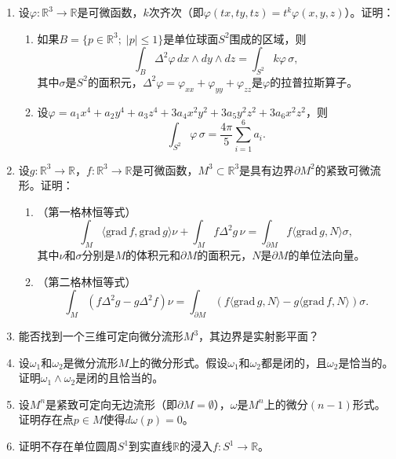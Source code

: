 \documentclass[12pt,a4paper]{ctexbook}
\begin{document}
\begin{enumerate}
    \item 设$\varphi:\mathbb{R}^3\to\mathbb{R}$是可微函数，$k$次齐次（即$\varphi(tx,ty,tz) = t^k\varphi(x,y,z)$）。证明：
    \begin{enumerate}[label=\alph*)]
        \item 如果$B = \{p\in\mathbb{R}^3;\; |p|\leq 1\}$是单位球面$S^2$围成的区域，则
        $$\int_B \Delta^2\varphi\,dx\wedge dy\wedge dz = \int_{S^2} k\varphi\,\sigma,$$
        其中$\sigma$是$S^2$的面积元，$\Delta^2\varphi = \varphi_{xx}+\varphi_{yy}+\varphi_{zz}$是$\varphi$的拉普拉斯算子。
        
        \item 设$\varphi = a_1x^4 + a_2y^4 + a_3z^4 + 3a_4x^2y^2 + 3a_5y^2z^2 + 3a_6x^2z^2$，则
        $$\int_{S^2} \varphi\,\sigma = \frac{4\pi}{5}\sum_{i=1}^6 a_i.$$
    \end{enumerate}
    
    \item 设$g:\mathbb{R}^3\to\mathbb{R}$，$f:\mathbb{R}^3\to\mathbb{R}$是可微函数，$M^3\subset\mathbb{R}^3$是具有边界$\partial M^2$的紧致可微流形。证明：
    \begin{enumerate}[label=\alph*)]
        \item （第一格林恒等式）
        $$\int_M \langle \text{grad}\,f, \text{grad}\,g\rangle\nu + \int_M f\Delta^2 g\,\nu = \int_{\partial M} f\langle \text{grad}\,g, N\rangle\sigma,$$
        其中$\nu$和$\sigma$分别是$M$的体积元和$\partial M$的面积元，$N$是$\partial M$的单位法向量。
        
        \item （第二格林恒等式）
        $$\int_M (f\Delta^2 g - g\Delta^2 f)\nu = \int_{\partial M} (f\langle \text{grad}\,g, N\rangle - g\langle \text{grad}\,f, N\rangle)\sigma.$$
    \end{enumerate}
    
    \item 能否找到一个三维可定向微分流形$M^3$，其边界是实射影平面？
    
    \item 设$\omega_1$和$\omega_2$是微分流形$M$上的微分形式。假设$\omega_1$和$\omega_2$都是闭的，且$\omega_2$是恰当的。证明$\omega_1\wedge\omega_2$是闭的且恰当的。
    
    \item 设$M^n$是紧致可定向无边流形（即$\partial M=\emptyset$），$\omega$是$M^n$上的微分$(n-1)$形式。证明存在点$p\in M$使得$d\omega(p)=0$。
    
    \item 证明不存在单位圆周$S^1$到实直线$\mathbb{R}$的浸入$f:S^1\to\mathbb{R}$。
    

\end{enumerate}
\end{document}
